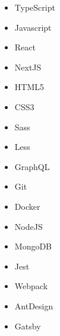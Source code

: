 
\begin{itemize}
    \item TypeScript
    \item Javascript
    \item React
    \item NextJS
    \item HTML5
    \item CSS3
    \item Sass
    \item Less
    \item GraphQL
    \item Git
    \item Docker
    \item NodeJS
    \item MongoDB
    \item Jest
    \item Webpack
    \item AntDesign
    \item Gatsby
\end{itemize}

